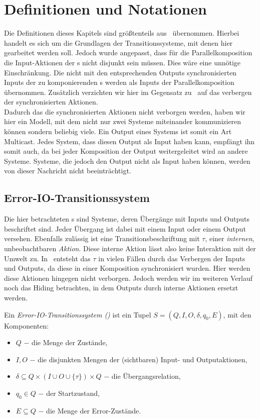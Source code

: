 \chapter{Definitionen und Notationen}

Die Definitionen dieses Kapitels sind größtenteils aus~\cite{Vogler2014EIO}
übernommen. Hierbei handelt es sich um die Grundlagen der Transitionssysteme,
mit denen hier gearbeitet werden soll. Jedoch wurde angepasst, dass für die
Parallelkomposition die Input-Aktionen der \EIO{}s nicht disjunkt sein müssen.
Dies wäre eine unnötige Einschränkung. Die nicht mit den entsprechenden Outputs
synchronisierten Inputs der zu komponierenden \EIO{}s werden als Inputs der
Parallelkomposition übernommen. Zusätzlich verzichten wir hier im Gegensatz
zu~\cite{Vogler2014EIO} auf das verbergen der synchronisierten Aktionen.\\
Dadurch das die synchronisierten Aktionen nicht verborgen werden, haben wir hier
ein Modell, mit dem nicht nur zwei Systeme miteinander kommunizieren können
sondern beliebig viele. Ein Output eines Systems ist somit ein Art Multicast.
Jedes System, dass diesen Output als Input haben kann, empfängt ihn somit auch,
da bei jeder Komposition der Output weitergeleitet wird an andere Systeme.
Systeme, die jedoch den Output nicht als Input haben können, werden von dieser
Nachricht nicht beeinträchtigt.

\section{Error-IO-Transitionssystem}
Die hier betrachteten \EIO{}s sind Systeme, deren Übergänge mit Inputs und
Outputs beschriftet sind. Jeder Übergang ist dabei mit einem Input oder einem
Output versehen. Ebenfalls zulässig ist eine Transitionsbeschriftung mit
$\tau$, einer \emph{internen}, unbeobachtbaren \emph{Aktion}. Diese interne
Aktion lässt also keine Interaktion mit der Umwelt zu. In~\cite{Vogler2014EIO}
entsteht das $\tau$ in vielen Fällen durch das Verbergen der Inputs und
Outputs, da diese in einer Komposition synchronisiert wurden. Hier werden diese
Aktionen hingegen nicht verborgen. Jedoch werden wir im weiteren Verlauf noch
das Hiding betrachten, in dem Outputs durch interne Aktionen ersetzt werden.

\begin{Def}
  Ein \emph{Error-IO-Transitionssystem \linebreak (\EIO{})} ist
  ein Tupel $S=(Q,I,O,\delta, q_0, E)$, mit den Komponenten:
  \begin{itemize}
    \item $Q$ $-$ die Menge der Zustände,
    \item $I,O$ $-$ die disjunkten Mengen der (sichtbaren) Input- und
      Outputaktionen,
    \item $\delta\subseteq Q\times (I\cup O\cup\{\tau\})\times Q$ $-$ die
      Übergangsrelation,
    \item $q_0\in Q$ $-$ der Startzustand,
    \item $E\subseteq Q$ $-$ die Menge der Error-Zustände.
  \end{itemize}
\end{Def}

